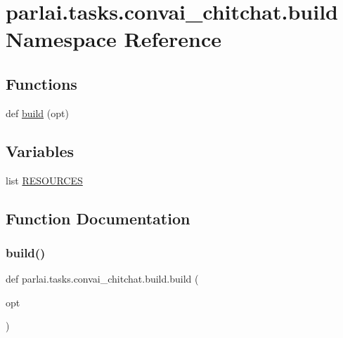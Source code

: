 \hypertarget{namespaceparlai_1_1tasks_1_1convai__chitchat_1_1build}{}\section{parlai.\+tasks.\+convai\+\_\+chitchat.\+build Namespace Reference}
\label{namespaceparlai_1_1tasks_1_1convai__chitchat_1_1build}
\subsection*{Functions}
\begin{DoxyCompactItemize}
\item 
def \hyperlink{namespaceparlai_1_1tasks_1_1convai__chitchat_1_1build_a3c8d628ed6619549434124fc4c755995}{build} (opt)
\end{DoxyCompactItemize}
\subsection*{Variables}
\begin{DoxyCompactItemize}
\item 
list \hyperlink{namespaceparlai_1_1tasks_1_1convai__chitchat_1_1build_a687e95f80a9c6975e5ad72cb5ff3c93b}{R\+E\+S\+O\+U\+R\+C\+ES}
\end{DoxyCompactItemize}


\subsection{Function Documentation}
\mbox{\label{namespaceparlai_1_1tasks_1_1convai__chitchat_1_1build_a3c8d628ed6619549434124fc4c755995}} 
\subsubsection{\texorpdfstring{build()}{build()}}
{\footnotesize\ttfamily def parlai.\+tasks.\+convai\+\_\+chitchat.\+build.\+build (\begin{DoxyParamCaption}\item[{}]{opt }\end{DoxyParamCaption})}



